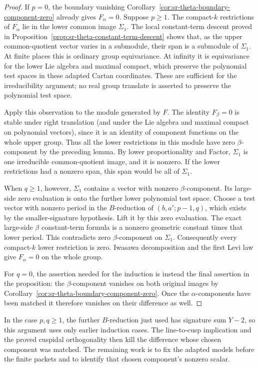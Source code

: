 \begin{proof}
If \(p=0\), the boundary vanishing
Corollary~\ref{cor:sr-theta-boundary-component-zero} already gives
\(F_\alpha=0\). Suppose \(p\ge1\). The compact-\(k\) restrictions
of \(F_\alpha\) lie in the lower common image \(\Sigma_1\).
The local constant-term descent proved in
Proposition~\ref{prop:sr-theta-constant-term-descent} shows that,
as the upper common-quotient vector varies in a submodule,
their span is a submodule of \(\Sigma_1\).
At finite places this is ordinary group equivariance.
At infinity it is equivariance for the lower Lie algebra
and maximal compact, which preserve the polynomial test spaces
in these adapted Cartan coordinates. These are sufficient for
the irreducibility argument; no real group translate is asserted
to preserve the polynomial test space.

Apply this observation to the module generated by \(F\).
The identity \(F_\beta=0\) is stable under right translation
(and under the Lie algebra and maximal compact on polynomial
vectors), since it is an identity of component functions on
the whole upper group. Thus all the lower restrictions in
this module have zero \(\beta\)-component by the preceding lemma.
By lower proportionality and Factor, \(\Sigma_1\) is one
irreducible common-quotient image, and it is nonzero.
If the lower restrictions had a nonzero span, this span
would be all of \(\Sigma_1\).

When \(q\ge1\), however, \(\Sigma_1\) contains a vector with
nonzero \(\beta\)-component. Its large-side zero evaluation
is onto the further lower polynomial test space. Choose
a test vector with nonzero period in the \(B\)-reduction
of \((b,a';p-1,q)\), which exists by the smaller-signature
hypothesis. Lift it by this zero evaluation. The exact
large-side \(\beta\) constant-term formula is a nonzero
geometric constant times that lower period.
This contradicts zero \(\beta\)-component on \(\Sigma_1\).
Consequently every compact-\(k\) lower restriction is zero.
Iwasawa decomposition and the first Levi law give
\(F_\alpha=0\) on the whole group.

For \(q=0\), the assertion needed for the induction is
instead the final assertion in the proposition:
the \(\beta\)-component vanishes on both original images
by Corollary~\ref{cor:sr-theta-boundary-component-zero}.
Once the \(\alpha\)-components have been matched it
therefore vanishes on their difference as well.
\end{proof}

In the case \(p,q\ge1\), the further \(B\)-reduction just used
has signature sum \(Y-2\), so this argument uses only earlier
induction cases. The line-to-cusp implication and the proved
cuspidal orthogonality then kill the difference whose chosen
component was matched. The remaining work is to fix the
adapted models before the finite packets and to identify
that chosen component's nonzero scalar.
